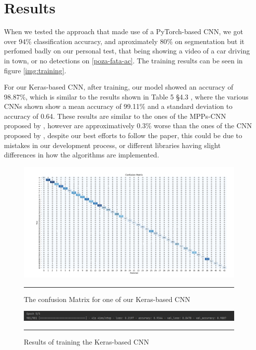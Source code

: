 \documentclass[conference]{IEEEtran}
\begin{document}
\section{Results}

When we tested the approach that made use of a PyTorch-based CNN, we got over 94\% classification accuracy, and aproximately 80\%
on segmentation but it perfomed badly on our personal test, that being showing a video of
a car driving in town, or no detections on \ref{poza-fata-ac}. The training results can be seen in figure \ref{img:training}.

For our Keras-based CNN, after training, our model showed an accuracy of 98.87\%, which is similar to the results shown in
Table 5 \S 4.3 \cite{svm_paper}, where the various CNNs shown show a mean accuracy of 99.11\% and a standard deviation to accuracy
of 0.64. These results are similar to the ones of the MPPs-CNN proposed by \cite{7603237}, however are approximatively 0.3\% worse
than the ones of the CNN proposed by \cite{svm_paper}, despite our best efforts to follow the paper, this could be due to mistakes
in our development process, or different libraries having slight differences in how the algorithms are implemented.

\begin{figure}
    \includegraphics[width=\linewidth,]{Keras-Confusion-Matrix}
    \centering
    \label{img:confusion}
    \caption{The confusion Matrix for one of our Keras-based CNN}
    \noindent\rule{\textwidth}{1pt}
\end{figure}

\begin{figure}
    \includegraphics[width=\linewidth,]{Keras-Training-Results}
    \centering
    \label{img:results}
    \caption{Results of training the Keras-based CNN}
    \noindent\rule{\textwidth}{1pt}
\end{figure}
\end{document}
